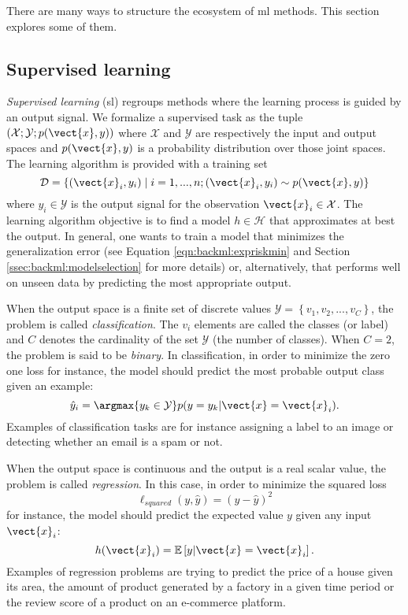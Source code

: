There are many ways to structure the ecosystem of \acrlong{ml} methods. This
section explores some of them.

\subsection{Supervised learning}
\label{ssec:backml:sl}

\textit{Supervised learning} (\acrshort{sl}) regroups methods where the learning
process is guided by an output signal. We formalize a supervised task as the tuple
$\left(\mathcal{X}; \mathcal{Y}; p(\vect{x}, y)\right)$ where $\mathcal{X}$ and
$\mathcal{Y}$ are respectively the input and output spaces and $p(\vect{x}, y)$
is a probability distribution over those joint spaces. The learning algorithm is
provided with a training set
\begin{equation}
\label{eqn:backml:supervised}
\mathcal{D} = \left\{(\vect{x}_i, y_i) \mid i = 1,...,n ; (\vect{x}_i, y_i) \sim p(\vect{x}, y) \right\}
\end{equation}
where $y_i \in \mathcal{Y}$ is the output signal for the observation
$\vect{x}_i \in \mathcal{X}$. The learning algorithm objective is to find a model
$h \in \mathcal{H}$ that approximates at best the output. In general, one wants to train 
a model that minimizes the generalization error (see Equation \ref{eqn:backml:expriskmin} and 
Section \ref{ssec:backml:modelselection} for more details) or, alternatively, that 
performs well on unseen data by predicting the most appropriate output.

When the output space is a finite set of discrete values
$\mathcal{Y} = \left\{v_1, v_2, ..., v_C\right\}$, the problem is called
\textit{classification}. The $v_i$ elements are called the classes (or label) and
$C$ denotes the cardinality of the set $\mathcal{Y}$ (\ie the number of classes).
When $C = 2$, the problem is said to be \textit{binary}. In classification, in order to 
minimize the zero one loss for instance, the model should predict the most probable 
output class given an example:
\begin{equation}
\hat{y}_i = \argmax{y_k \in \mathcal{Y}} p(y=y_k|\vect{x}=\vect{x}_i).
\end{equation}
Examples of classification tasks are for instance assigning a label to an image
or detecting whether an email is a spam or not.

When the output space is continuous and the output is a real scalar value, the
problem is called \textit{regression}. In this case, in order to minimize the squared loss
\begin{equation}
  \label{eqn:backml:squaredloss}
  \ell_{squared}(y, \hat{y}) = (y - \hat{y})^2
\end{equation}
for instance, the model should predict the
expected value $y$ given any input $\vect{x}_i$:
\begin{equation}
h(\vect{x}_i) = \mathbb{E}\left[y|\vect{x}=\vect{x}_i\right].
\end{equation}
Examples of regression problems are trying to predict the price of a house given
its area, the amount of product generated by a factory in a given time period or
the review score of a product on an e-commerce platform.

